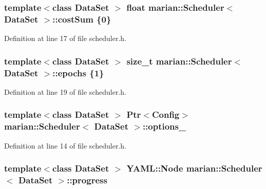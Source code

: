 \subsubsection[{\texorpdfstring{cost\+Sum}{costSum}}]{\setlength{\rightskip}{0pt plus 5cm}template$<$class Data\+Set $>$ float {\bf marian\+::\+Scheduler}$<$ Data\+Set $>$\+::cost\+Sum \{0\}\hspace{0.3cm}{\ttfamily [private]}}\hypertarget{classmarian_1_1Scheduler_a277799516747fa7de995c0502b1ca481}{}\label{classmarian_1_1Scheduler_a277799516747fa7de995c0502b1ca481}


Definition at line 17 of file scheduler.\+h.

\subsubsection[{\texorpdfstring{epochs}{epochs}}]{\setlength{\rightskip}{0pt plus 5cm}template$<$class Data\+Set $>$ size\+\_\+t {\bf marian\+::\+Scheduler}$<$ Data\+Set $>$\+::epochs \{1\}\hspace{0.3cm}{\ttfamily [private]}}\hypertarget{classmarian_1_1Scheduler_af63f13e7b7219211e9b1e353f36000fa}{}\label{classmarian_1_1Scheduler_af63f13e7b7219211e9b1e353f36000fa}


Definition at line 19 of file scheduler.\+h.

\subsubsection[{\texorpdfstring{options\+\_\+}{options_}}]{\setlength{\rightskip}{0pt plus 5cm}template$<$class Data\+Set $>$ {\bf Ptr}$<${\bf Config}$>$ {\bf marian\+::\+Scheduler}$<$ Data\+Set $>$\+::options\+\_\+\hspace{0.3cm}{\ttfamily [private]}}\hypertarget{classmarian_1_1Scheduler_a82aeb8a4ec08a364bec7c6aac6a25e01}{}\label{classmarian_1_1Scheduler_a82aeb8a4ec08a364bec7c6aac6a25e01}


Definition at line 14 of file scheduler.\+h.

\subsubsection[{\texorpdfstring{progress}{progress}}]{\setlength{\rightskip}{0pt plus 5cm}template$<$class Data\+Set $>$ Y\+A\+M\+L\+::\+Node {\bf marian\+::\+Scheduler}$<$ Data\+Set $>$\+::progress\hspace{0.3cm}{\ttfamily [private]}}\hypertarget{classmarian_1_1Scheduler_ae3fc3dd391d460a070c88a133997d187}{}\label{classmarian_1_1Scheduler_ae3fc3dd391d460a070c88a133997d187}


